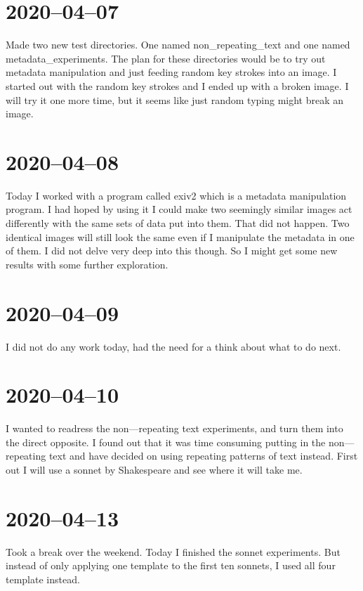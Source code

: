 \documentclass[12pt, letterpaper]{article}
\begin{document}
\section{2020--04--07}
Made two new test directories. One named non\_repeating\_text and one
named metadata\_experiments. The plan for these directories would be to try out
metadata manipulation and just feeding random key strokes into an image. I
started out with the random key strokes and I ended up with a broken image. I
will try it one more time, but it seems like just random typing might break an
image.

\section{2020--04--08}
Today I worked with a program called exiv2 which is a metadata manipulation
program. I had hoped by using it I could make two seemingly similar images act
differently with the same sets of data put into them. That did not happen. Two
identical images will still look the same even if I manipulate the metadata in
one of them. I did not delve very deep into this though. So I might get some new
results with some further exploration.

\section{2020--04--09}
I did not do any work today, had the need for a think about what to do next.

\section{2020--04--10}
I wanted to readress the non---repeating text experiments, and turn them into the
direct opposite. I found out that it was time consuming putting in the
non---repeating text and have decided on using repeating patterns of text instead.
First out I will use a sonnet by Shakespeare and see where it will take me.

\section{2020--04--13}
Took a break over the weekend. Today I finished the sonnet experiments. But
instead of only applying one template to the first ten sonnets, I used all four
template instead.
\end{document}
